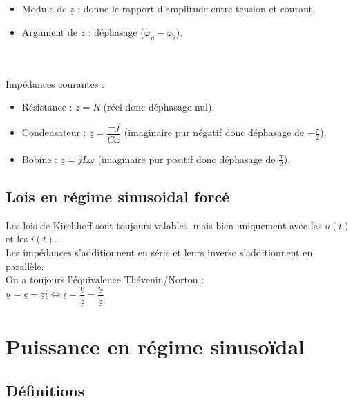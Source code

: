 \documentclass[13pt, twoside, a4paper, french]{report}
\begin{document}
    \begin{itemize}
        \item Module de $\underline{z}$ : donne le rapport d'amplitude entre tension et courant.
        \item Argument de $\underline{z}$ : déphasage ($\varphi_u - \varphi_i$).
    \end{itemize}
    \\ \vspace{7pt}\\
    Impédances courantes :
    \begin{itemize}
        \item Résistance : $z = R$ (réel donc déphasage nul).
        \item Condensateur : $\underline{z} = \dfrac{-j}{C \omega}$ (imaginaire pur négatif donc déphasage de $-\frac{\pi}{2}$).
        \item Bobine : $\underline{z} = jL \omega$ (imaginaire pur positif donc déphasage de $\frac{\pi}{2}$).
    \end{itemize}


    \section{Lois en régime sinusoidal forcé}\label{sec:lois-en-regime-sinusoidal-force}

    Les lois de Kirchhoff sont toujours valables, mais bien uniquement avec les $u(t)$ et les $i(t)$.\\

    Les impédances s'additionnent en série et leurs inverse s'additionnent en parallèle.\\

    On a toujours l'équivalence Thévenin/Norton :\\
    $\underline{u} = \underline{e} - \underline{z} \underline{i} \iff \underline{i} = \dfrac{\underline{e}}{\underline{z}} - \dfrac{\underline{u}}{\underline{z}}$


    \chapter{Puissance en régime sinusoïdal}\label{ch:puissance-en-regime-sinusoidal}


    \section{Définitions}\label{sec:definitions}
\end{document}
